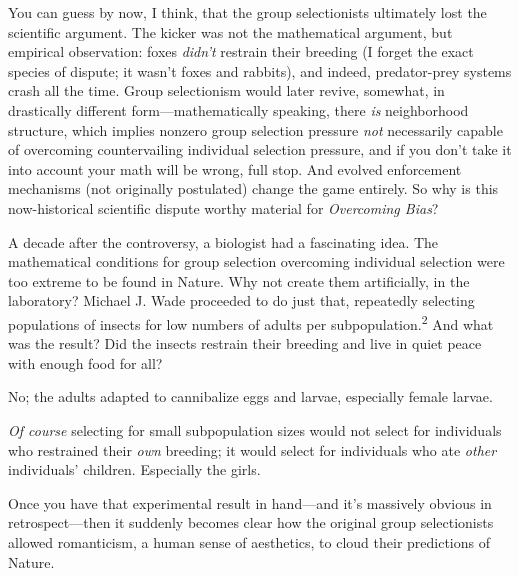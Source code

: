 {
 You can guess by now, I think, that the group selectionists
ultimately lost the scientific argument. The kicker was not the
mathematical argument, but empirical observation: foxes
\textit{didn't} restrain their breeding (I forget the
exact species of dispute; it wasn't foxes and rabbits),
and indeed, predator-prey systems crash all the time. Group
selectionism would later revive, somewhat, in drastically different
form---mathematically speaking, there \textit{is} neighborhood
structure, which implies nonzero group selection pressure \textit{not}
necessarily capable of overcoming countervailing individual selection
pressure, and if you don't take it into account your
math will be wrong, full stop. And evolved enforcement mechanisms (not
originally postulated) change the game entirely. So why is this
now-historical scientific dispute worthy material for
\textit{Overcoming Bias}?}

{
 A decade after the controversy, a biologist had a fascinating
idea. The mathematical conditions for group selection overcoming
individual selection were too extreme to be found in Nature. Why not
create them artificially, in the laboratory? Michael J. Wade proceeded
to do just that, repeatedly selecting populations of insects for low
numbers of adults per subpopulation.\textsuperscript{2} And what was
the result? Did the insects restrain their breeding and live in quiet
peace with enough food for all?}

{
 No; the adults adapted to cannibalize eggs and larvae, especially
female larvae.}

{
 \textit{Of course} selecting for small subpopulation sizes would
not select for individuals who restrained their \textit{own} breeding;
it would select for individuals who ate \textit{other}
individuals' children. Especially the girls.}

{
 Once you have that experimental result in hand---and
it's massively obvious in retrospect---then it suddenly
becomes clear how the original group selectionists allowed romanticism,
a human sense of aesthetics, to cloud their predictions of Nature.}

